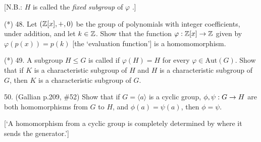 \documentclass[12pt]{article}
\begin{document}
\begin{description}
\item{\spc} [N.B.: $H$ is called the {\it fixed subgroup} of $\varphi$ .]

\msk

\item{(*) 48.} Let $({\mathbb Z}[x],+,0)$ be the group of polynomials with integer
coefficients, under addition, and let $k\in{\mathbb Z}$. Show that the function $\varphi:{\mathbb Z}[x]\rightarrow {\mathbb Z}$ 
given by $\varphi(p(x))=p(k)$ [the `evaluation function'] is a homomomorphism.

\msk

\item{(*) 49.} A subgroup $H\leq G$ is called  if
$\varphi(H)=H$ for every $\varphi\in\textrm{Aut}(G)$. Show that if 
$K$ is a characteristic subgroup of $H$ and $H$ is a characteristic subgroup of $G$,
then $K$ is a characteristic subgroup of $G$.

\msk

\item{50.} (Gallian p.209, \#52) Show that if $G=\langle a\rangle$ is a cyclic group, 
$\phi,\psi:G\rightarrow H$ are both homomorphisms from $G$ to $H$, and $\phi(a)=\psi(a)$,
then $\phi=\psi$. 

\item{\spc} [`A homomorphism from a cyclic group is completely determined
by where it sends the generator.']


\end{description}
\vfill
\end{document}
